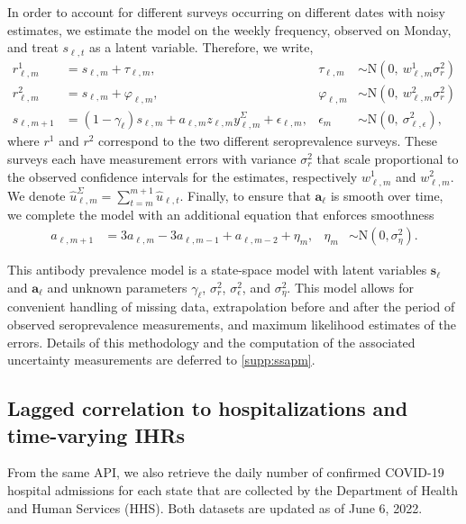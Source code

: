 \documentclass{article}
\begin{document}
In order to account for different surveys occurring on different dates with
noisy estimates, we estimate the model on the weekly frequency, observed on
Monday, and treat $s_{\ell,t}$ as a latent variable. Therefore, we write,
\begin{align}
\label{eq:waningpr}
r^1_{\ell,m} &= s_{\ell,m} + \tau_{\ell,m}, 
  & \tau_{\ell,m} &\sim \textrm{N}(0,\ w^1_{\ell,m}\sigma^2_r)\\
r^2_{\ell,m} &= s_{\ell,m} + \varphi_{\ell,m}, 
  & \varphi_{\ell,m} &\sim \textrm{N}(0,\ w^2_{\ell,m}\sigma^2_r)\\
s_{\ell,m+1} &= (1 -\gamma_{\ell}) s_{\ell,m} + 
  a_{\ell,m} z_{\ell,m} y^\Sigma_{\ell,m} + \epsilon_{\ell,m}, 
  & \epsilon_{m} &\sim \textrm{N}(0,\ \sigma^2_{\ell,\epsilon}),
\end{align}
where $r^1$ and $r^2$ correspond to the two different seroprevalence surveys.
These surveys each have measurement errors with variance $\sigma^2_r$ that scale
proportional to the observed confidence intervals for the estimates,
respectively $w^1_{\ell,m}$ and $w^2_{\ell,m}$. We denote
$\widehat{u}^\Sigma_{\ell,m} = \sum_{t=m}^{m+1} \widehat{u}_{\ell,t}$. Finally,
to ensure that $\mathbf{a}_\ell$ is smooth over time, we complete the model with
an additional equation that enforces smoothness
\begin{align}
a_{\ell,m+1} &= 3a_{\ell,m} - 3a_{\ell,m-1} + a_{\ell,m-2} + \eta_m, 
  &\eta_m  &\sim \textrm{N}(0, \sigma^2_{\eta}).
\end{align}
    
This antibody prevalence model is a state-space model with latent variables
$\mathbf{s}_{\ell}$ and $\mathbf{a}_{\ell}$ and unknown parameters $\gamma_\ell$,
$\sigma^2_r$, $\sigma^2_\epsilon$, and $\sigma^2_\eta$. This model
allows for convenient handling of missing data, extrapolation
before and after the period of observed seroprevalence measurements, and maximum
likelihood estimates of the errors. Details of this
methodology and the computation of the associated uncertainty measurements are
deferred to \autoref{supp:ssapm}.



\subsection{Lagged correlation to hospitalizations and time-varying IHRs} 

From the same API, we also retrieve the daily number of confirmed COVID-19
hospital admissions for each state that are collected by the \US Department of
Health and Human Services (HHS). Both datasets are updated as of June 6, 2022.
\end{document}
